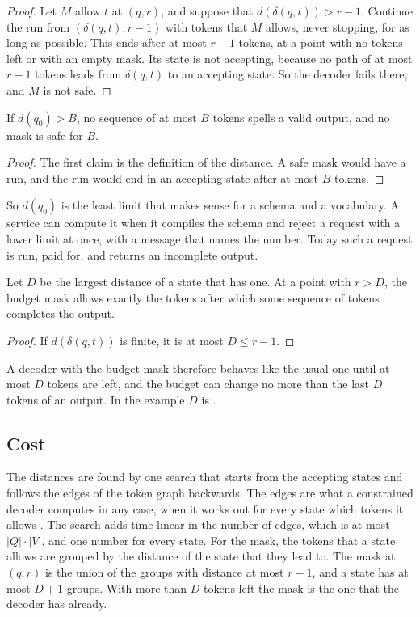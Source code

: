 \documentclass[acmsmall,nonacm,screen]{acmart}
\newcommand{\far}{d}
\begin{document}
\begin{proof}
Let $M$ allow $t$ at $(q, r)$, and suppose that $\far(\delta(q, t)) > r - 1$. Continue the
run from $(\delta(q, t), r - 1)$ with tokens that $M$ allows, never stopping, for as long as
possible. This ends after at most $r - 1$ tokens, at a point with no tokens left or with an
empty mask. Its state is not accepting, because no path of at most $r - 1$ tokens leads from
$\delta(q, t)$ to an accepting state. So the decoder fails there, and $M$ is not safe.
\end{proof}

\begin{theorem}\label{thm:before}
If $\far(q_0) > B$, no sequence of at most $B$ tokens spells a valid output, and no mask is
safe for $B$.
\end{theorem}

\begin{proof}
The first claim is the definition of the distance. A safe mask would have a run, and the run
would end in an accepting state after at most $B$ tokens.
\end{proof}

So $\far(q_0)$ is the least limit that makes sense for a schema and a vocabulary. A service
can compute it when it compiles the schema and reject a request with a lower limit at once,
with a message that names the number. Today such a request is run, paid for, and returns an
incomplete output.

\begin{theorem}\label{thm:end}
Let $D$ be the largest distance of a state that has one. At a point with $r > D$, the budget
mask allows exactly the tokens after which some sequence of tokens completes the output.
\end{theorem}

\begin{proof}
If $\far(\delta(q, t))$ is finite, it is at most $D \le r - 1$.
\end{proof}

A decoder with the budget mask therefore behaves like the usual one until at most $D$ tokens
are left, and the budget can change no more than the last $D$ tokens of an output. In the
example $D$ is \exExampleWidest{}.

\subsection{Cost}

The distances are found by one search that starts from the accepting states and follows the
edges of the token graph backwards. The edges are what a constrained decoder computes in any
case, when it works out for every state which tokens it allows \citep{Willard2023}. The
search adds time linear in the number of edges, which is at most $|Q| \cdot |V|$, and one
number for every state. For the mask, the tokens that a state allows are grouped by the
distance of the state that they lead to. The mask at $(q, r)$ is the union of the groups
with distance at most $r - 1$, and a state has at most $D + 1$ groups. With more than $D$
tokens left the mask is the one that the decoder has already.
\end{document}
